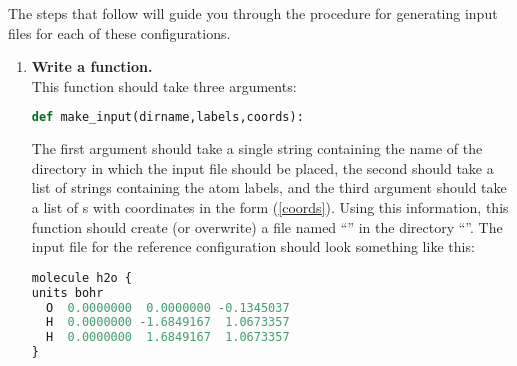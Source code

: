 \documentclass[11pt]{article}
\begin{document}
The steps that follow will guide you through the procedure for generating input
files for each of these configurations.
\begin{enumerate}[label=\textbf{\arabic*}]
\item {\bf Write a  function.}\\
This function should take three arguments:
\begin{addmargin}{2cm}{}
\begin{lstlisting}[language=python]
def make_input(dirname,labels,coords):
\end{lstlisting}
\end{addmargin}
The first argument should take a single string containing the name of the
directory in which the input file should be placed, the second should take a
list of strings containing the atom labels, and the third argument should take
a list of s with coordinates in the form (\ref{coords}). Using this
information, this function should create (or overwrite) a file named
``'' in the directory ``''. The input file for the
reference configuration should look something like this:
\begin{addmargin}{2cm}{}
\begin{lstlisting}[language=python]
molecule h2o {
units bohr
  O  0.0000000  0.0000000 -0.1345037
  H  0.0000000 -1.6849167  1.0673357
  H  0.0000000  1.6849167  1.0673357
}


\end{lstlisting}
\end{addmargin}
\end{enumerate}
\end{document}
